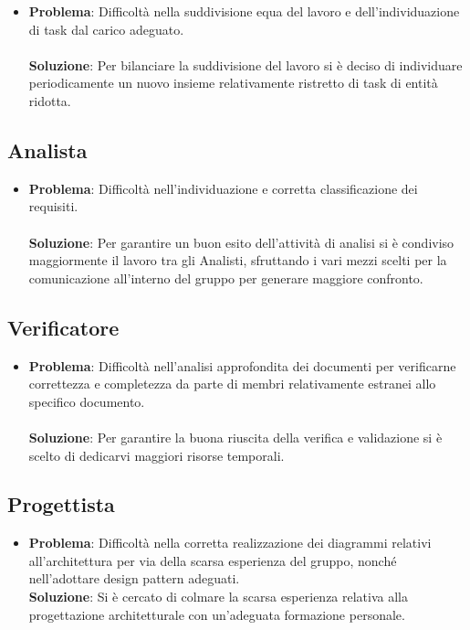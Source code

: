 \documentclass[openany,12pt,a4paper]{report}
\begin{document}
\begin{itemize}
	\item \textbf{Problema}: Difficoltà nella suddivisione equa del lavoro e dell'individuazione di task dal carico adeguato. \\ \\
	\textbf{Soluzione}: Per bilanciare la suddivisione del lavoro si è deciso di individuare periodicamente un nuovo insieme relativamente ristretto di task di entità ridotta.
\end{itemize}

\subsection{Analista}

\begin{itemize}
	\item \textbf{Problema}: Difficoltà nell'individuazione e corretta classificazione dei requisiti. \\ \\
	\textbf{Soluzione}: Per garantire un buon esito dell'attività di analisi si è condiviso maggiormente il lavoro tra gli Analisti, sfruttando i vari mezzi scelti per la comunicazione
	all'interno del gruppo per generare maggiore confronto.
\end{itemize}

\subsection{Verificatore}

\begin{itemize}
	\item \textbf{Problema}: Difficoltà nell'analisi approfondita dei documenti per verificarne correttezza e completezza da parte di membri relativamente estranei allo specifico documento. \\ \\
	\textbf{Soluzione}: Per garantire la buona riuscita della verifica e validazione si è scelto di dedicarvi maggiori risorse temporali.
\end{itemize}

\subsection{Progettista}
\begin{itemize}
	\item \textbf{Problema}: Difficoltà nella corretta realizzazione dei diagrammi relativi all'architettura per via della scarsa esperienza del gruppo, nonché nell'adottare design pattern adeguati. \\
	\textbf{Soluzione}: Si è cercato di colmare la scarsa esperienza relativa alla progettazione architetturale con un'adeguata formazione personale.
\end{itemize}
\end{document}
